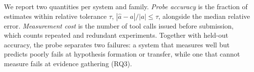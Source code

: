 We report two quantities per system and family. \emph{Probe accuracy} is the fraction of estimates within relative tolerance $\tau$, $|\hat a-a|/|a|\le\tau$, alongside the median relative error. \emph{Measurement cost} is the number of tool calls issued before submission, which counts repeated and redundant experiments. Together with held-out accuracy, the probe separates two failures: a system that measures well but predicts poorly fails at hypothesis formation or transfer, while one that cannot measure fails at evidence gathering (RQ3). 
